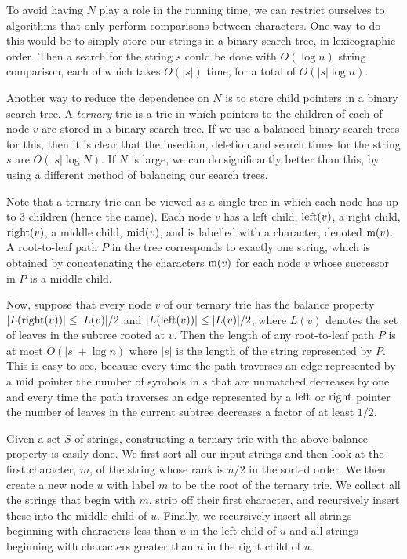 To avoid having $N$ play a role in the running time, we can restrict
ourselves to algorithms that only perform comparisons between
characters.  One way to do this would be to simply store our strings
in a binary search tree, in lexicographic order.  Then a search for
the string $s$ could be done with $O(\log n)$ string comparison, each
of which takes $O(|s|)$ time, for a total of $O(|s|\log n)$.

Another way to reduce the dependence on $N$ is to store child pointers
in a binary search tree.  A \emph{ternary} trie is a trie in which
pointers to the children of each of node $v$ are stored in a binary
search tree.  If we use a balanced binary search trees for this, then it
is clear that the insertion, deletion and search times for the string
$s$ are $O(|s|\log N)$.  If $N$ is large, we can do significantly
better than this, by using a different method of balancing our search
trees.

Note that a ternary trie can be viewed as a single tree in which each
node has up to 3 children (hence the name).  Each node $v$ has a left
child, $\mathrm{left}(v)$, a right child, $\mathrm{right}(v)$, a middle child, $\mathrm{mid}(v)$,
and is labelled with a character, denoted $\mathrm{m}(v)$.  A root-to-leaf path
$P$ in the tree corresponds to exactly one string, which is obtained by
concatenating the characters $\mathrm{m}(v)$ for each node $v$ whose successor
in $P$ is a middle child.

Now, suppose that every node $v$ of our ternary trie has the balance
property $|L(\mathrm{right}(v))|\le |L(v)|/2$ and $|L(\mathrm{left}(v))|\le |L(v)|/2$,
where $L(v)$ denotes the set of leaves in the subtree rooted at $v$.
Then the length of any root-to-leaf path $P$ is at most $O(|s|+\log
n)$ where $|s|$ is the length of the string represented by $P$.  This
is easy to see, because every time the path traverses an edge
represented by a $\mathrm{mid}$ pointer the number of symbols in $s$ that are
unmatched decreases by one and every time the path traverses an edge
represented by a $\mathrm{left}$ or $\mathrm{right}$ pointer the number of leaves in the
current subtree decreases a factor of at least $1/2$.

Given a set $S$ of strings, constructing a ternary trie with the above
balance property is easily done.  We first sort all our input strings
and then look at the first character, $m$, of the string whose rank is
$n/2$ in the sorted order.  We then create a new node $u$ with label
$m$ to be the root of the ternary trie.  We collect all the strings
that begin with $m$, strip off their first character, and recursively
insert these into the middle child of $u$.  Finally, we recursively
insert all strings beginning with characters less than $u$ in the left
child of $u$ and all strings beginning with characters greater than
$u$ in the right child of $u$.

